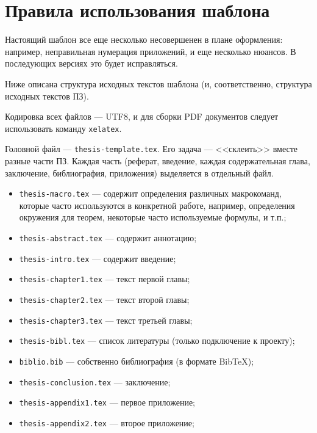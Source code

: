 ﻿\chapter{Правила использования шаблона}\label{app-manual}

Настоящий шаблон все еще несколько несовершенен в плане оформления: например, неправильная нумерация приложений, и еще несколько нюансов. В последующих версиях это будет исправляться.

Ниже описана структура исходных текстов шаблона (и, соответственно, структура исходных текстов ПЗ).

Кодировка всех файлов — UTF8, и для сборки PDF документов следует использовать команду \texttt{xelatex}.

Головной файл --- \texttt{thesis-template.tex}. Его задача --- <<склеить>> вместе разные части ПЗ. Каждая часть (реферат, введение, каждая содержательная глава, заключение, библиография, приложения) выделяется в отдельный файл. 

\begin{itemize}
  \item[] \texttt{thesis-macro.tex} --- содержит определения различных макрокоманд, которые часто используются в конкретной работе, например, определения окружения для теорем, некоторые часто используемые формулы, и т.п.;
  \item[] \texttt{thesis-abstract.tex} --- содержит аннотацию;
  \item[] \texttt{thesis-intro.tex} --- содержит введение;
  \item[] \texttt{thesis-chapter1.tex} --- текст первой главы;
  \item[] \texttt{thesis-chapter2.tex} --- текст второй главы;
  \item[] \texttt{thesis-chapter3.tex} --- текст третьей главы;
  \item[] \texttt{thesis-bibl.tex} --- список литературы (только подключение к
  проекту);
  \item[] \texttt{biblio.bib} --- собственно библиография (в формате BibTeX);
  \item[] \texttt{thesis-conclusion.tex} --- заключение;
  \item[] \texttt{thesis-appendix1.tex} --- первое приложение;
  \item[] \texttt{thesis-appendix2.tex} --- второе приложение;
\end{itemize}



